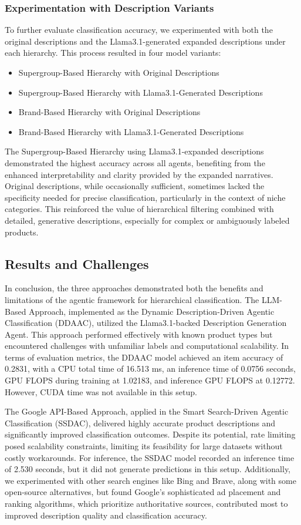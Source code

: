 \documentclass[9pt,a4paper,twoside]{rho-class/rho}
\begin{document}
\subsubsection{Experimentation with Description Variants}
To further evaluate classification accuracy, we experimented with both the original descriptions and the Llama3.1-generated expanded descriptions under each hierarchy. This process resulted in four model variants:
\begin{itemize}
    \item Supergroup-Based Hierarchy with Original Descriptions
    \item Supergroup-Based Hierarchy with Llama3.1-Generated Descriptions
    \item Brand-Based Hierarchy with Original Descriptions
    \item Brand-Based Hierarchy with Llama3.1-Generated Descriptions
\end{itemize}

The Supergroup-Based Hierarchy using Llama3.1-expanded descriptions demonstrated the highest accuracy across all agents, benefiting from the enhanced interpretability and clarity provided by the expanded narratives. Original descriptions, while occasionally sufficient, sometimes lacked the specificity needed for precise classification, particularly in the context of niche categories. This reinforced the value of hierarchical filtering combined with detailed, generative descriptions, especially for complex or ambiguously labeled products.

\subsection{Results and Challenges}
In conclusion, the three approaches demonstrated both the benefits and limitations of the agentic framework for hierarchical classification. The LLM-Based Approach, implemented as the Dynamic Description-Driven Agentic Classification (DDAAC), utilized the Llama3.1-backed Description Generation Agent. This approach performed effectively with known product types but encountered challenges with unfamiliar labels and computational scalability. In terms of evaluation metrics, the DDAAC model achieved an item accuracy of 0.2831, with a CPU total time of 16.513 ms, an inference time of 0.0756 seconds, GPU FLOPS during training at 1.02183, and inference GPU FLOPS at 0.12772. However, CUDA time was not available in this setup.

The Google API-Based Approach, applied in the Smart Search-Driven Agentic Classification (SSDAC), delivered highly accurate product descriptions and significantly improved classification outcomes. Despite its potential, rate limiting posed scalability constraints, limiting its feasibility for large datasets without costly workarounds. For inference, the SSDAC model recorded an inference time of 2.530 seconds, but it did not generate predictions in this setup. Additionally, we experimented with other search engines like Bing and Brave, along with some open-source alternatives, but found Google’s sophisticated ad placement and ranking algorithms, which prioritize authoritative sources, contributed most to improved description quality and classification accuracy.
\end{document}
